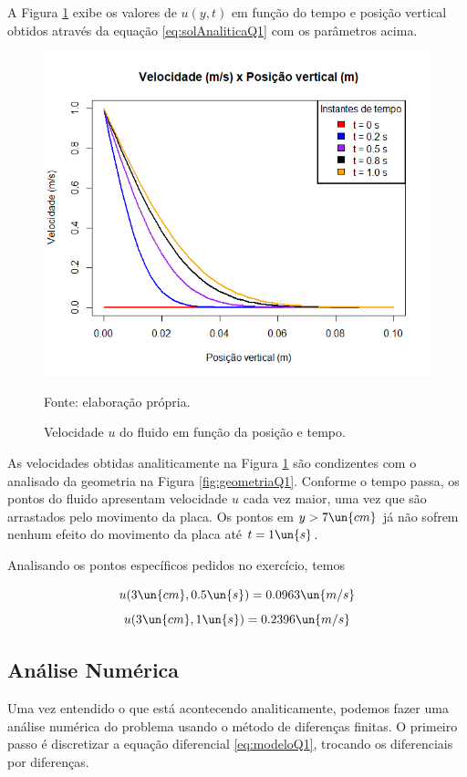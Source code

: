 A Figura \ref*{fig:velocidadesAnaliticaQ1}
exibe os valores de $u(y,t)$ em função do tempo e posição vertical obtidos através da equação
\eqref{eq:solAnaliticaQ1} com os parâmetros acima.

\begin{figure}[h!]
    \caption{Velocidade $u$ do fluido em função da posição e tempo.}
    \label{fig:velocidadesAnaliticaQ1}
    \centering
    \centerline{\includegraphics[scale=0.5]{velocidadesAnaltico.png}}
    \par{Fonte: elaboração própria.}
\end{figure}

As velocidades obtidas analiticamente na Figura \ref*{fig:velocidadesAnaliticaQ1} são condizentes
com o analisado da geometria na Figura \ref*{fig:geometriaQ1}. Conforme o tempo passa,
os pontos do fluido apresentam velocidade $u$ cada vez maior, uma vez que são arrastados
pelo movimento da placa. Os pontos em $y > 7 \un{cm}$ já não sofrem nenhum efeito
do movimento da placa até $t = 1 \un{s}$.

Analisando os pontos específicos pedidos no exercício, temos

\[ u(3 \un{cm}, 0.5 \un{s}) = 0.0963 \un{m/s} \]
\[ u(3 \un{cm}, 1 \un{s}) = 0.2396 \un{m/s} \]

\subsection{Análise Numérica}

Uma vez entendido o que está acontecendo analiticamente, podemos fazer uma análise
numérica do problema usando o método de diferenças finitas. O primeiro passo
é discretizar a equação diferencial \eqref{eq:modeloQ1}, trocando os diferenciais
por diferenças.

